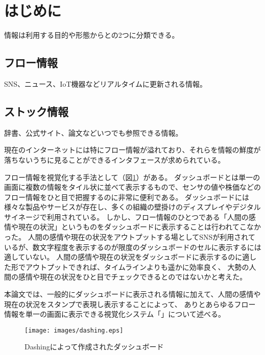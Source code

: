 \section{はじめに}

情報は利用する目的や形態からとの2つに分類できる。

\subsection*{フロー情報}

SNS、ニュース、IoT機器などリアルタイムに更新される情報。

\subsection*{ストック情報}

辞書、公式サイト、論文などいつでも参照できる情報。\vspace{0.2in}

現在のインターネットには特にフロー情報が溢れており、それらを情報の鮮度が落ちないうちに見ることができるインタフェースが求められている。

フロー情報を視覚化する手法として（図\ref{dashing}）がある。
ダッシュボードとは単一の画面に複数の情報をタイル状に並べて表示するもの\cite{few2005}で、センサの値や株価などのフロー情報をひと目で把握するのに非常に便利である。
ダッシュボードには様々な製品やサービスが存在し、多くの組織の壁掛けのディスプレイやデジタルサイネージで利用されている。
しかし、フロー情報のひとつである「人間の感情や現在の状況」というものをダッシュボードに表示することは行われてこなかった。
人間の感情や現在の状況をアウトプットする場としてSNSが利用されているが、数文字程度を表示するのが限度のダッシュボードのセルに表示するには適していない。
人間の感情や現在の状況をダッシュボードに表示するのに適した形でアウトプットできれば、タイムラインよりも遥かに効率良く、
大勢の人間の感情や現在の状況をひと目でチェックできるとのではないかと考えた。

本論文では、一般的にダッシュボードに表示される情報に加えて、人間の感情や現在の状況をスタンプで表現し表示することによって、
ありとあらゆるフロー情報を単一の画面に表示できる視覚化システム「」について述べる。

\begin{figure}[h]
\centering
\texttt{[image: images/dashing.eps]}
\caption{Dashingによって作成されたダッシュボード}
\label{dashing}
\end{figure}